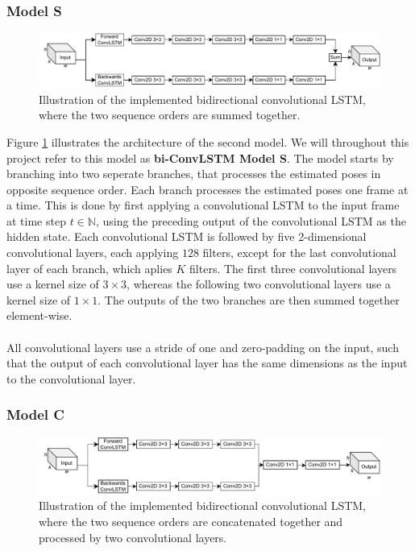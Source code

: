 \documentclass[./main.tex]{subfiles}
\begin{document}
\subsubsection{Model S}
\begin{figure}[htbp]
    \centering
    \includegraphics[width=\textwidth]{./entities/bi_conv_lstm.pdf}
    \caption{Illustration of the implemented bidirectional convolutional LSTM, where the two sequence orders are summed together.}
    \label{fig:bi_conv_lstm}
\end{figure}
\noindent Figure \ref{fig:bi_conv_lstm} illustrates the architecture of the second model. We will throughout this project refer to this model as \textbf{bi-ConvLSTM Model S}. The model starts by branching into two seperate branches, that processes the estimated poses in opposite sequence order. Each branch processes the estimated poses one frame at a time. This is done by first applying a convolutional LSTM to the input frame at time step $t \in \mathbb{N}$, using the preceding output of the convolutional LSTM as the hidden state. Each convolutional LSTM is followed by five 2-dimensional convolutional layers, each applying $128$ filters, except for the last convolutional layer of each branch, which aplies $K$ filters. The first three convolutional layers use a kernel size of $3 \times 3$, whereas the following two convolutional layers use a kernel size of $1 \times 1$. The outputs of the two branches are then summed together element-wise.
\\
\\
All convolutional layers use a stride of one and zero-padding on the input, such that the output of each convolutional layer has the same dimensions as the input to the convolutional layer.

\subsubsection{Model C}
\begin{figure}[htbp]
    \centering
    \includegraphics[width=\textwidth]{./entities/unipose2.pdf}
    \caption{Illustration of the implemented bidirectional convolutional LSTM, where the two sequence orders are concatenated together and processed by two convolutional layers.}
    \label{fig:unipose2}
\end{figure}
\end{document}
